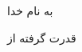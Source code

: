 \documentclass{article}[12pt]
\begin{document}
\begin{centering}
به نام خدا\\
\end{centering}
\begin{centering}
قدرت گرفته از \lr{\LaTeX}

\end{centering}
\end{document}
